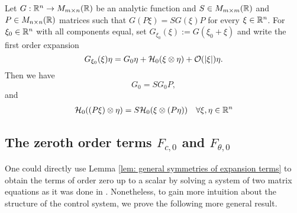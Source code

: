 \begin{lemma}
\label{lem: general symmetries of expansion terms}
Let $G: \mathbb{R}^n \to M_{m \times n}(\mathbb{R})$ be an analytic function and $S \in M_{m \times m}(\mathbb{R})$ and $P \in M_{n \times n}(\mathbb{R})$ matrices such that $G(P \xi) = S G(\xi) P$ for every $\xi \in \mathbb{R}^n$. For $\xi_0 \in \mathbb{R}^n$ with all components equal, set $G_{\xi_0}(\xi) := G(\xi_0 + \xi)$ and write the first order expansion
\begin{equation}
	G_{\xi_0}(\xi)\eta = G_0 \eta + \mathcal{H}_0(\xi \otimes \eta) + \mathcal{O}(|\xi|)\eta.
\end{equation}
Then we have
\begin{equation}
	G_0 = S G_0 P,
\end{equation}
and
\begin{eqnarray}
	\mathcal{H}_0((P \xi) \otimes \eta) = S \mathcal{H}_0(\xi \otimes (P \eta)) &  & \forall \xi, \eta \in \mathbb{R}^n
\end{eqnarray}
\end{lemma}

\subsection{The zeroth order terms $F_{c,0}$ and $F_{\theta, 0}$} 
One could directly use Lemma \ref{lem: general symmetries of expansion terms} to obtain the terms of order zero up to a scalar by solving a system of two matrix equations as it was done in \cite{Alouges2017}. Nonetheless, to gain more intuition about the structure of the control system, we prove the following more general result.



